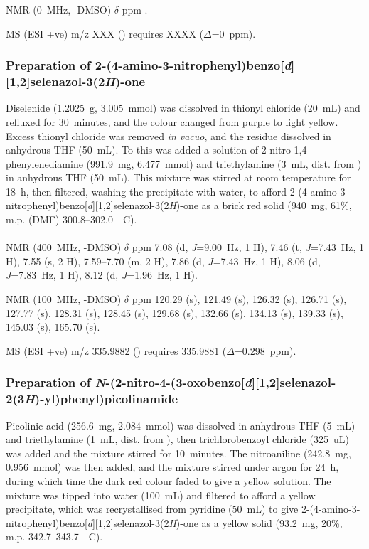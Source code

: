  NMR (0~MHz, -DMSO) $\delta$ ppm
.

MS (ESI +ve) m/z XXX ()  requires XXXX ($\Delta$=0~ppm).

\normalsize


\subsubsection{Preparation of 2-(4-amino-3-nitrophenyl)benzo[\emph{d}][1,2]selenazol-3(2\emph{H})-one }
Diselenide  (1.2025~g, 3.005~mmol) was dissolved in thionyl chloride (20~mL) and refluxed for 30~minutes, and the colour changed from purple to light yellow.
Excess thionyl chloride was removed \emph{in vacuo}, and the residue dissolved in anhydrous THF (50~mL).
To this was added a solution of 2-nitro-1,4-phenylenediamine (991.9~mg, 6.477~mmol) and triethylamine (3~mL, dist. from ) in anhydrous THF (50~mL).
This mixture was stirred at room temperature for 18~h, then filtered, washing the precipitate with water, to afford 2-(4-amino-3-nitrophenyl)benzo[\emph{d}][1,2]selenazol-3(2\emph{H})-one  as a brick red solid (940~mg, 61\%, m.p. (DMF) 300.8--302.0~\degree~C).

\footnotesize\paragraph{}

 NMR (400~MHz, -DMSO) $\delta$ ppm
7.08 (d, \emph{J}=9.00~Hz, 1 H),
7.46 (t, \emph{J}=7.43~Hz, 1 H),
7.55 (s, 2 H),
7.59--7.70 (m, 2 H),
7.86 (d, \emph{J}=7.43~Hz, 1 H),
8.06 (d, \emph{J}=7.83~Hz, 1 H),
8.12 (d, \emph{J}=1.96~Hz, 1 H).

 NMR (100~MHz, -DMSO) $\delta$ ppm
120.29 (s),
121.49 (s),
126.32 (s),
126.71 (s),
127.77 (s),
128.31 (s),
128.45 (s),
129.68 (s),
132.66 (s),
134.13 (s),
139.33 (s),
145.03 (s),
165.70 (s).

MS (ESI +ve) m/z 335.9882 ()  requires 335.9881 ($\Delta$=0.298~ppm).

\normalsize


\subsubsection{Preparation of \emph{N}-(2-nitro-4-(3-oxobenzo[\emph{d}][1,2]selenazol-2(3\emph{H})-yl)phenyl)picolinamide }
Picolinic acid (256.6~mg, 2.084~mmol) was dissolved in anhydrous THF (5~mL) and triethylamine (1~mL, dist. from ), then trichlorobenzoyl chloride (325~uL) was added and the mixture stirred for 10~minutes.
The nitroaniline  (242.8~mg, 0.956~mmol) was then added, and the mixture stirred under argon for 24~h, during which time the dark red colour faded to give a yellow solution.
The mixture was tipped into water (100~mL) and filtered to afford a yellow precipitate, which was recrystallised from pyridine (50~mL) to give 2-(4-amino-3-nitrophenyl)benzo[\emph{d}][1,2]selenazol-3(2\emph{H})-one  as a yellow solid (93.2~mg, 20\%, m.p. 342.7--343.7~\degree~C).

